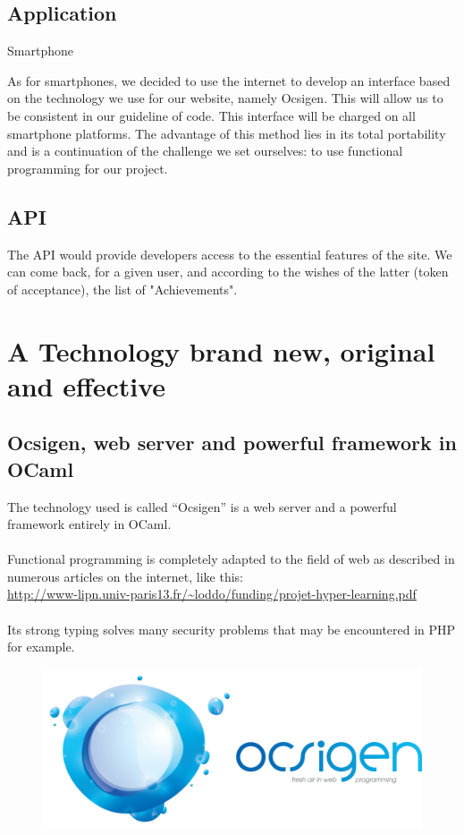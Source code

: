 \documentclass {life-en}
\begin{document}
\section{Application} Smartphone

As for smartphones, we decided to use the internet to develop an interface based on the technology we use for our website, namely Ocsigen. This will allow us to be consistent in our guideline of code. This interface will be charged on all smartphone platforms. The advantage of this method lies in its total portability and is a continuation of the challenge we set ourselves: to use functional programming for our project.

\section{API}

The API would provide developers access to the essential features of the site. We can come back, for a given user, and according to the wishes of the latter (token of acceptance), the list of "Achievements".



\chapter{A Technology brand new, original and effective}

\section{Ocsigen, web server and powerful framework in OCaml}

The technology used is called ``Ocsigen'' is a web server and a powerful framework entirely in OCaml.\\
  \\
Functional programming is completely adapted to the field of web as described in numerous articles on the internet, like this: \\
\url{http://www-lipn.univ-paris13.fr/~loddo/funding/projet-hyper-learning.pdf} \\
\\
Its strong typing solves many security problems that may be encountered in PHP for example.\\

\begin{figure} [H]
  \begin{center}
    \includegraphics [width = 13cm]{img/ocsigen.png}
  \end{center}
\end{figure}
\end{document}
